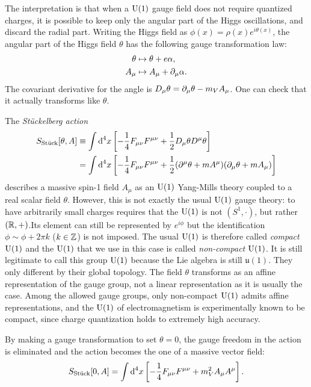 \documentclass[a4paper,8pt]{article}
\begin{document}
        The interpretation is that when a $\text{U}(1)$ gauge field does not require quantized charges, it is possible to keep only the angular part of the Higgs oscillations, and discard the radial part. Writing the Higgs field as $\phi(x)=\rho(x)e^{i\theta(x)}$, the angular part of the Higgs field $\theta$ has the following gauge transformation law:
        \begin{align}
            \theta &\mapsto \theta+e\alpha,\\
            A_\mu &\mapsto A_\mu+\partial_\mu\alpha.
        \end{align}
        The covariant derivative for the angle is $D_\mu\theta=\partial_\mu\theta-m_VA_\mu$. One can check that it actually transforms like $\theta$.

        The \emph{Stückelberg action}
        \begin{align}
            S_{\text{Stück}}[\theta,A] &\equiv \int\text{d}^4x\left[-\frac{1}{4}F_{\mu\nu}F^{\mu\nu}+\frac{1}{2}D_\mu\theta D^\mu\theta\right]\\
            &= \int\text{d}^4x\left[ -\frac{1}{4}F_{\mu\nu}F^{\mu\nu}+\frac{1}{2}(\partial^\mu\theta+mA^\mu)(\partial_\mu\theta+mA_\mu) \right]
        \end{align}
        describes a massive spin-1 field $A_\mu$ as an $\text{U}(1)$ Yang-Mills theory coupled to a real scalar field $\theta$. However, this is not exactly the usual $\text{U}(1)$ gauge theory: to have arbitrarily small charges requires that the $\text{U}(1)$ is not $(S^1,\cdot)$, but rather $(\mathbb{R},+)$.Its element can still be represented by $e^{i\phi}$ but the identification $\phi\sim\phi+2\pi k$ ($k\in\mathbb{Z}$) is not imposed. The usual $\text{U}(1)$ is therefore called \emph{compact $\text{U}(1)$} and the $\text{U}(1)$ that we use in this case is called \emph{non-compact $\text{U}(1)$}. It is still legitimate to call this group $\text{U}(1)$ because the Lie algebra is still $\mathfrak{u}(1)$. They only different by their global topology. The field $\theta$ transforms as an affine representation of the gauge group, not a linear representation as it is usually the case. Among the allowed gauge groups, only non-compact $\text{U}(1)$ admits affine representations, and the $\text{U}(1)$ of electromagnetism is experimentally known to be compact, since charge quantization holds to extremely high accuracy.

        By making a gauge transformation to set $\theta=0$, the gauge freedom in the action is eliminated and the action becomes the one of a massive vector field:
        \begin{equation}
            S_{\text{Stück}}[0,A] = \int\text{d}^4x\left[ -\frac{1}{4}F_{\mu\nu}F^{\mu\nu}+m^2_VA_\mu A^\mu \right].
        \end{equation}
\end{document}
